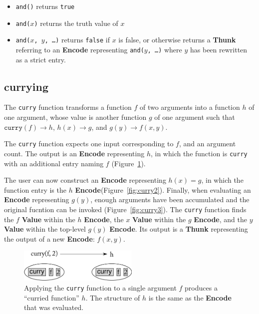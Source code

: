 \documentclass{article}
\newcommand{\valuex}{\textbf{Value}\xspace}
\newcommand{\encode}{\textbf{Encode}\xspace}
\newcommand{\thunk}{\textbf{Thunk}\xspace}
\newcommand{\bs}{\vspace{\baselineskip}}
\begin{document}
\begin{itemize}[itemsep=0pt]
\item \texttt{and()} returns \texttt{true}
\item \texttt{and($x$)} returns the truth value of $x$
\item \texttt{and($x$, $y$, \ldots)} returns \texttt{false} if $x$ is false, or otherwise returns a \thunk referring to an 
\encode representing \texttt{and($y$, \ldots)} where $y$ has been rewritten as a strict entry.
\end{itemize}

\subsection{currying} The \texttt{curry} function transforms
a function $f$ of two arguments into a function $h$ of one argument,
whose value is another function $g$ of one argument such that $\texttt{curry}(f) \rightarrow h$, $h(x) \rightarrow g$, and $g(y) \rightarrow f(x,y)$.

\bs

The \texttt{curry} function expects one input corresponding to $f$,
and an argument count. The output is an \encode representing
$h$, in which the function is \texttt{curry} with an additional entry
naming $f$ (Figure~\ref{fig:curry1}).

\bs

The user can now construct an \encode representing $h(x) = g$, in
which the function entry is the $h$ \encode (Figure~\ref{fig:curry2}).
Finally, when evaluating an \encode representing $g(y)$, enough
arguments have been accumulated and the original fucntion can be
invoked (Figure~\ref{fig:curry3}). The \texttt{curry} function finds
the $f$ \valuex within the $h$ \encode, the $x$ \valuex within the $g$
\encode, and the $y$ \valuex within the top-level $g(y)$ \encode.  Its
output is a \thunk representing the output of a new \encode: $f(x,y)$.

\begin{figure}[h!]
  \begin{centering}
    \includegraphics[height=60px]{curry1.pdf}

  \end{centering}

  \caption{Applying the \texttt{curry} function to a single argument $f$ produces a ``curried function'' $h$. The structure of $h$ is the same as the \encode that was evaluated.}
  \label{fig:curry1}
\end{figure}
\end{document}
